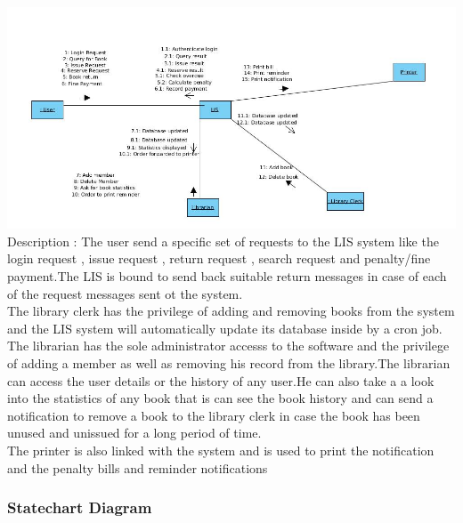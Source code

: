 \documentclass[a4paper]{article}
\begin{document}
\includegraphics[scale=0.50]{images/collaDiag.jpg}
\\
Description : The user send a specific set of requests to the LIS system like the login request , issue request , return request , search request and penalty/fine payment.The LIS is bound to send back suitable return messages in case of each of the request messages sent ot the system.
\\
The library clerk has the privilege of adding and removing books from the system and the LIS system will automatically update its database inside by a cron job.
\\
The librarian has the sole administrator accesss to the software and the privilege of adding a member as well as removing his record from the library.The librarian can access the user details or the history of any user.He can also take a a look into the statistics of any book that is can see the book history and can send a notification to remove a book to the library clerk in case the book has been unused and unissued for a long period of time.
\\
The printer is also linked with the system and is used to print the notification and the penalty bills and reminder notifications

\subsubsection{Statechart Diagram}
\end{document}
